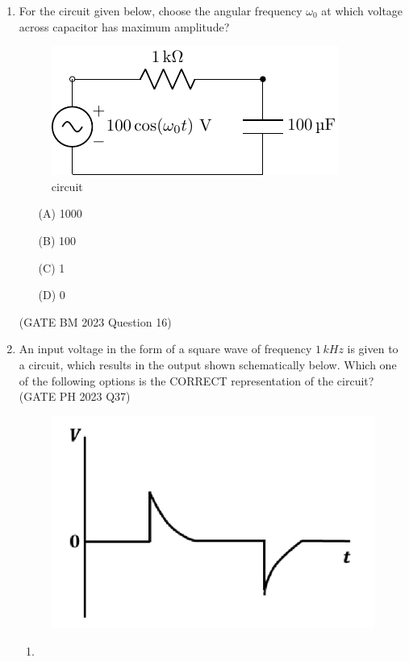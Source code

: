 \begin{enumerate}[label=\thechapter.\arabic*,ref=\thechapter.\theenumi]
\item
For the circuit given below, choose the angular frequency $ \omega_0$ at which voltage across capacitor has maximum amplitude?
\begin{figure}[h!]
    \includegraphics[width = 0.5\columnwidth]{2023/BM/16/figs/c_fig1.pdf}
    \caption{circuit }
    \centering
    \label{fig: bm_16_fig_1}
\end{figure}
\begin{enumerate}
    \item[(A)] 1000
    \item[(B)] 100
    \item[(C)] 1
    \item[(D)] 0   
\end{enumerate}
\hfill(GATE BM 2023 Question 16)\\

\pagebreak
\item An input voltage in the form of a square wave of frequency $1\, kHz$ is given to a circuit, which results in the output shown schematically below. Which one of the following options is the CORRECT representation of the circuit? \hfill(GATE PH 2023 Q37)
\begin{figure}[!h]
    \centering
    \includegraphics[width = 0.6\columnwidth]{2023/PH/37/figs/question.png}
    \caption{}
\end{figure}

\begin{enumerate}[label = (\alph*)]
    \item 
    \begin{figure}[!h]
        \centering
	    \resizebox{0.2\textwidth}{!}{}
    \end{figure}


\end{enumerate}
\end{enumerate}
